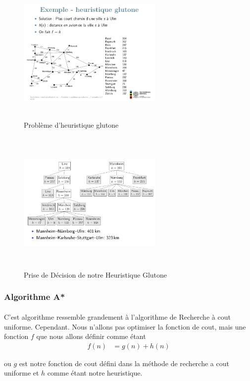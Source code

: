 \documentclass[oneside]{book}
\begin{document}
\begin{figure}[!ht]
\centering
\includegraphics[width = 7cm, height = 7cm, keepaspectratio]{Heuristique_Glutone_Prob.png}
\caption{Problème d'heuristique glutone}
\label{fig:Prob_Heuristique_Glutone}
\end{figure}

\begin{figure}[!ht]
\centering
\includegraphics[width = 7cm, height = 7cm, keepaspectratio]{Heuristique_Glutone.png}
\caption{Prise de Décision de notre Heuristique Glutone}
\label{fig:Heuristique_Glutone}
\end{figure}

\subsubsection{Algorithme A*}
\paragraph{}
C'est algorithme ressemble grandement à l'algorithme de Recherche à cout uniforme. Cependant. Nous n'allons pas optimiser la fonction de cout, mais une fonction $f$ que nous allons définir comme étant
\begin{align*}
f(n) &= g(n) + h(n)
\end{align*}
\begin{center}
ou $g$ est notre fonction de cout défini dans la méthode de recherche a cout uniforme et $h$ comme étant notre heuristique. 
\end{center}
\end{document}
